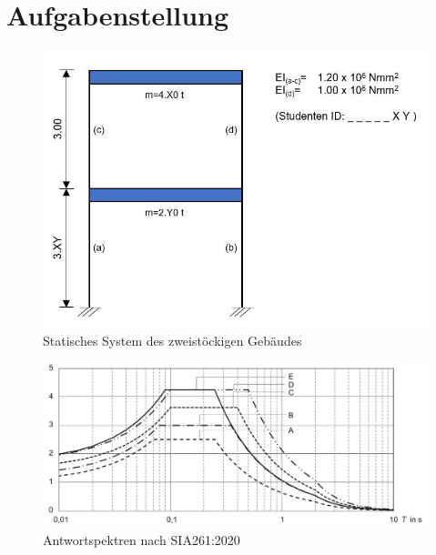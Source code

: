 \documentclass[
  letterpaper,
  DIV=11]{scrreprt}
\begin{document}
\hypertarget{aufgabenstellung-14}{%
\section{Aufgabenstellung}\label{aufgabenstellung-14}}

\begin{figure}[H]

{\centering \includegraphics{bilder/zweistoeckig_objekt.jpg}

}

\caption{\label{fig-zweistock}Statisches System des zweistöckigen
Gebäudes}

\end{figure}

\begin{figure}[H]

{\centering \includegraphics{bilder/antwortspektren_norm.jpg}

}

\caption{\label{fig-antwortspektren}Antwortspektren nach SIA261:2020}

\end{figure}
\end{document}
